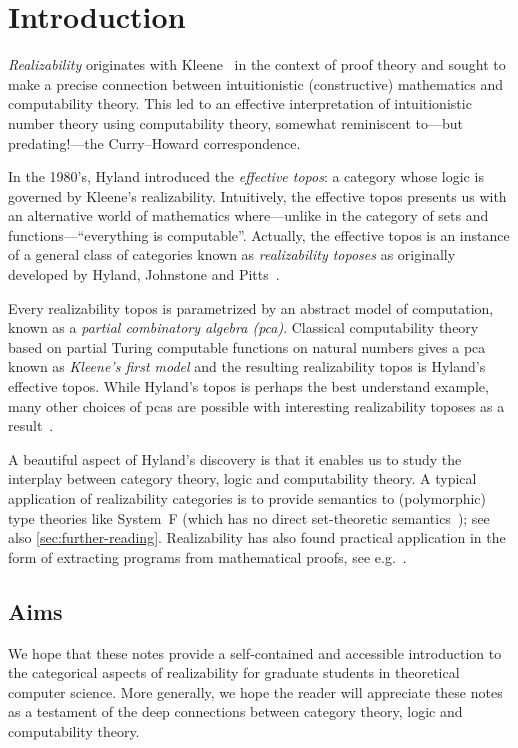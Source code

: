 \chapter{Introduction}

\emph{Realizability} originates with Kleene~\cite{Kleene1945} in the context of
proof theory and sought to make a precise connection between intuitionistic
(constructive) mathematics and computability theory.
%
This led to an effective interpretation of intuitionistic number theory using
computability theory, somewhat reminiscent to---but predating!---the
Curry--Howard correspondence.

In the 1980's, Hyland introduced the \emph{effective topos}: a category whose
logic is governed by Kleene's realizability.
%
Intuitively, the effective topos presents us with an alternative world of
mathematics where---unlike in the category of sets and functions---``everything is
computable''.
%
Actually, the effective topos is an instance of a general class of categories
known as \emph{realizability toposes} as originally developed by Hyland,
Johnstone and Pitts~\cite{HJP1980,Pitts1981}.

Every realizability topos is parametrized by an abstract model of computation,
known as a \emph{partial combinatory algebra (pca)}. Classical computability
theory based on partial Turing computable functions on natural numbers gives a
pca known as \emph{Kleene's first model} and the resulting realizability topos
is Hyland's effective topos.
%
While Hyland's topos is perhaps the best understand example, many other choices
of pcas are possible with interesting realizability toposes as a
result~\cite{vanOosten2008}.

A beautiful aspect of Hyland's discovery is that it enables us to study the
interplay between category theory, logic and computability theory.
%
A typical application of realizability categories is to provide semantics to
(polymorphic) type theories like System~F (which has no direct set-theoretic
semantics~\cite{Reynolds1984}); see also \cref{sec:further-reading}.
%
Realizability has also found practical application in the form of extracting
programs from mathematical proofs, see e.g.~\cite{Minlog}.

\section{Aims}
We hope that these notes provide a self-contained and accessible introduction to
the categorical aspects of realizability for graduate students in theoretical
computer science.
%
More generally, we hope the reader will appreciate these notes as a testament of
the deep connections between category theory, logic and computability theory.

